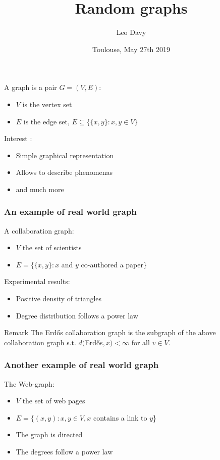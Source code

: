 \documentclass{beamer}
\title[]{Random graphs}
\author[]{Leo Davy}
\date[]{Toulouse, May 27th 2019}
\begin{document}
	\frame{\titlepage}

	\begin{frame}
		\begin{definition}
			A graph is a pair $G = (V,E)$:
			\begin{itemize}
				\item $V$ is the vertex set
				\item $E$ is the edge set, $E \subseteq \{\{x,y\}: x,y \in V\}$
			\end{itemize}
		\end{definition}
		Interest :
		\begin{itemize}
			\item Simple graphical representation
			\item Allows to describe phenomenas
			\item and much more
		\end{itemize}
	\end{frame}
	
	\begin{frame}
		\frametitle{An example of real world graph}
		A collaboration graph:
		\begin{itemize}
			\item $V$ the set of scientists
			\item $E = \{\{x,y\}: x $ and $y$ co-authored a paper$\}$
		\end{itemize}
		Experimental results:
		\begin{itemize}
			\item Positive density of triangles
			\item Degree distribution follows a power law 
		\end{itemize}
		\begin{block}{Remark}
			The Erd\H{o}s collaboration graph is the subgraph of the above collaboration graph s.t. $d($Erd\H{o}s$, x) < \infty$ for all $v\in V$.
		\end{block}
	\end{frame}

	\begin{frame}
		\frametitle{Another example of real world graph}
		The Web-graph:
		\begin{itemize}
			\item $V$ the set of web pages
			\item $E = \{(x,y):x,y \in V, x$ contains a link to $y$\}
		\end{itemize}
		\begin{itemize}
			\item The graph is directed
			\item The degrees follow a power law
		\end{itemize}
	\end{frame}
\end{document}

